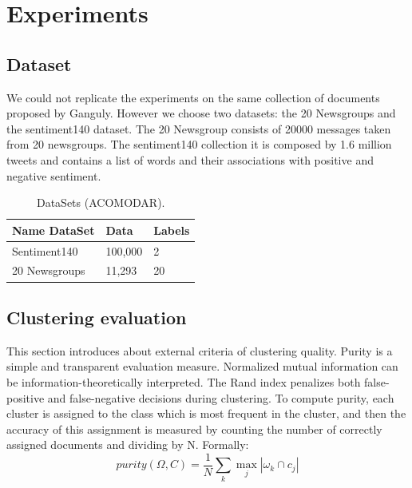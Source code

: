 \documentclass[runningheads]{llncs}
\begin{document}
\section{Experiments}

\subsection{Dataset}

We could not replicate the experiments on the same collection of
documents proposed by Ganguly\cite{ganguly_2018}. However 
we choose two datasets: the 20 Newsgroups and the sentiment140 dataset.
The 20 Newsgroup consists of 20000 messages taken from 20 newsgroups. 
The sentiment140 collection it is composed by 1.6 million tweets and contains a list of words and their associations with positive and negative sentiment.


\begin{table}
\centering
\caption{DataSets (ACOMODAR).}\label{tab1}
\begin{tabular}{|l|l|l|}
\hline
Name DataSet &  Data & Labels\\
\hline
Sentiment140 &  100,000& 2\\
20 Newsgroups & 11,293 & 20\\
\hline
\end{tabular}
\end{table}

%

\subsection{Clustering evaluation}

This section introduces about external criteria of clustering quality. Purity is
a simple and transparent evaluation measure. Normalized mutual information
can be information-theoretically interpreted. The Rand index penalizes both
false-positive and false-negative decisions during clustering.
To compute purity, each cluster is assigned to the class which is most frequent
in the cluster, and then the accuracy of this assignment is measured
by counting the number of correctly assigned documents and dividing by N.
Formally:
\[
purity(\Omega, C) = \frac{1}{N} \sum_k \max_j |\omega_k \cap c_j|
\]
\end{document}
